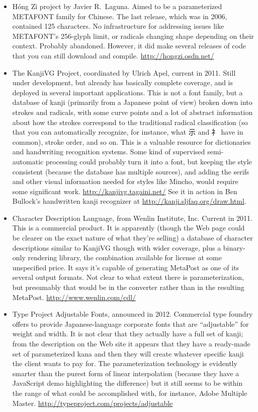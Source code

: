 \documentclass[14pt]{extarticle}
\begin{document}
\begin{itemize}
\item Hóng Zì project by Javier R.\ Laguna.  Aimed to be a parameterized
METAFONT family for Chinese.  The last release, which was in 2006,
contained 125 characters.  No infrastructure for addressing issues
like METAFONT's 256-glyph limit, or radicals changing shape depending
on their context.  Probably abandoned.  However, it did make several
releases of code that you can still download and compile.
\url{http://hongzi.osdn.net/}

\item The KanjiVG Project, coordinated by Ulrich Apel, current in 2011. 
Still under development, but already has basically complete coverage, and is
deployed in several important applications.  This is not a font family, but
a database of kanji (primarily from a Japanese point of view) broken down
into strokes and radicals, with some curve points and a lot of abstract
information about how the strokes correspond to the traditional radical
classification (so that you can automatically recognize, for instance, what
示 and 礻 have in common), stroke order, and so on.  This is a valuable
resource for dictionaries and handwriting recognition systems.  Some kind of
supervised semi-automatic processing could probably turn it into a font, but
keeping the style consistent (because the database has multiple sources),
and adding the serifs and other visual information needed for styles like
Mincho, would require some significant work. 
\url{http://kanjivg.tagaini.net/} See it in action in Ben Bullock's
handwritten kanji recognizer at \url{http://kanji.sljfaq.org/draw.html}.

\item Character Description Language, from Wenlin Institute, Inc.  Current
in 2011.  This is a commercial product.  It is apparently (though the
Web page could be clearer on the exact nature of what they're selling)
a database of character descriptions similar to KanjiVG though with
wider coverage, plus a binary-only rendering library, the combination
available for license at some unspecified price.  It says it's capable
of generating MetaPost as one of its several output formats.  Not
clear to what extent there is parameterization, but presumably that
would be in the converter rather than in the resulting MetaPost.
\url{http://www.wenlin.com/cdl/}

\item Type Project Adjustable Fonts, announced in 2012.  Commercial type
foundry offers to provide Japanese-language corporate fonts that are
``adjustable'' for weight and width.  It is not clear that they actually
have a full set of kanji; from the description on the Web site it appears
that they have a ready-made set of parameterized kana and then they will
create whatever specific kanji the client wants to pay for.  The
parameterization technology is evidently smarter than the purest form of
linear interpolation (because they have a JavaScript demo highlighting the
difference) but it still seems to be within the range of what could be
accomplished with, for instance, Adobe Multiple Master. 
\url{http://typeproject.com/projects/adjustable}

\end{itemize}
\end{document}
